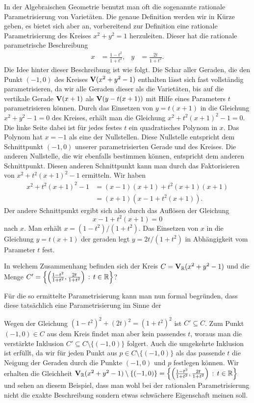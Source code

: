 \documentclass[11pt]{article}
\numberwithin{equation}{section}
\begin{document}
\begin{beispiel}
In der Algebraischen Geometrie benutzt man oft die sogenannte rationale Parametrisierung von Varietäten. Die genaue Definition werden wir in Kürze geben, es bietet sich aber an, vorbereitend zur Definition eine rationale Parametrisierung des Kreises  $x^2 + y^2  =1$ herzuleiten. Dieser hat die rationale parametrische Beschreibung 
\begin{align*}
		x  & = \frac{1-t^2}{1+t^2}, 
&		y & = \frac{2t}{1 + t^2}.
\end{align*}
Die Idee hinter dieser Beschreibung ist wie folgt. Die Schar aller Geraden, die den Punkt $(-1,0)$ des Kreises $\mathbf{V}(x^2 + y^2 - 1)$ enthalten lässt sich fast vollständig parametrisieren, da wir alle Geraden dieser als die Varietäten, bis auf die vertikale Gerade $\mathbf{V}(x+1)$ als $\mathbf{V}(y - t (x+1))$ mit Hilfe eines Parameters $t$ parametrisieren können. Durch das Einsetzen von $y = t (x+1)$ in die Gleichung $x^2 + y^2 -1 =0$ des Kreises, erhält man die Gleichung $x^2 + t^2 (x+1)^2  - 1 =0$. Die linke Seite dabei ist für jedes festes $t$ ein quadratisches Polynom in $x$. Das Polynom hat $x=-1$ als eine der Nullstellen. Diese Nullstelle entspricht dem Schnittpunkt $(-1,0)$ unserer parametrisierten Gerade und des Kreises. Die anderen Nullstelle, die wir ebenfalls bestimmen können, entspricht dem anderen Schnittpunkt. Diesen anderen Schnittpunkt kann man durch das Faktorisieren von $x^2 + t^2 (x+1)^2 -1$ ermitteln. Wir haben 
\begin{align*}
		x^2 + t^2 (x+1)^2 - 1 & = (x-1) (x+1) + t^2 (x+1) (x+1) 
		\\ & = (x+1) ( x-1 + t^2  (x+1)). 
\end{align*} 
Der andere Schnittpunkt ergibt sich also durch das Auflösen der Gleichung 
\[
	x-1 + t^2 (x+1) =0 
\]
nach $x$. Man erhält $x = (1-t^2) / (1+t^2)$. Das Einsetzen von $x$ in die Gleichung $y = t (x+1)$ der geraden legt $y = 2 t / (1+t^2)$ in Abhängigkeit vom Parameter $t$ fest. 

In welchem Zusammenhang befinden sich der Kreis $C=\mathbf{V}_{\mathbb{R}}(x^2 + y^2 -1)$ und die Menge $C'= \left\{ \left( \frac{1-t^2}{1+t^2} ,  \frac{2t}{ 1 + t^2} \right)  \,:\,  t\in\mathbb{R} \right\}$? 

Für die so ermittelte Parametrisierung kann man nun formal begründen, dass diese tatsächlich eine Parametrisierung im Sinne der 

Wegen der Gleichung $(1-t^2)^2 + (2t)^2 = (1+t^2)^2$ ist $C' \subseteq C$. 
 Zum Punkt $(-1,0) \in C$ aus dem Kreis findet man aber kein passendes $t$, woraus man die verstärkte Inklusion $C' \subseteq C \setminus \{(-1,0)\}$ folgert. Auch die umgekehrte Inklusion ist erfüllt, da wir für jeden Punkt aus $p \in C \setminus \{(-1,0)\}$ als das passende $t$ die Neigung der Geraden durch die Punkte $(-1,0)$ und $p$ festlegen können. Wir erhalten die Gleichheit  $\mathbf{V}_{\mathbb{R}}(x^2 + y^2 - 1) \setminus \{(-1,0)\} = \left\{  \left( \frac{1-t^2}{1+t^2} ,  \frac{2t}{ 1 + t^2} \right)  \,:\, t \in \mathbb{R} \right\}$ und sehen an diesem Beispiel, dass man wohl bei der rationalen Parametrisierung nicht die exakte Beschreibung sondern etwas schwächere Eigenschaft meinen soll. 
\end{beispiel} 
\end{document}
